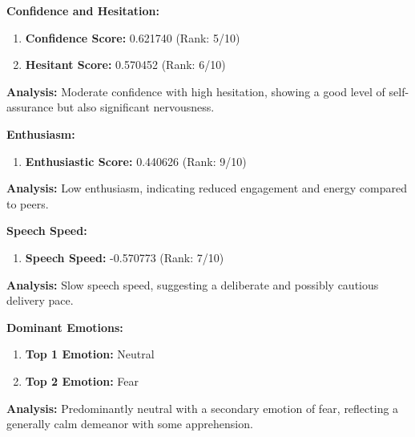 \documentclass{article}
\begin{document}
\large{\textbf{Confidence and Hesitation:}}
\begin{tcolorbox}[title=Confidence and Hesitant Scores]
    \begin{enumerate}
        \item \textbf{Confidence Score:} \textcolor{green!50!black}{0.621740} (Rank: 5/10)
        \item \textbf{Hesitant Score:} \textcolor{red!70!black}{0.570452} (Rank: 6/10)
    \end{enumerate}
\end{tcolorbox}
    \textbf{Analysis:} Moderate confidence with high hesitation, showing a good level of self-assurance but also significant nervousness.

\large{\textbf{Enthusiasm:}}
\begin{tcolorbox}[colback=cyan!5!white,colframe=cyan!75!black,title=Enthusiastic Score]
    \begin{enumerate}
        \item \textbf{Enthusiastic Score:} \textcolor{orange!70!black}{0.440626} (Rank: 9/10)
    \end{enumerate}
\end{tcolorbox}
    \textbf{Analysis:} Low enthusiasm, indicating reduced engagement and energy compared to peers.

\large{\textbf{Speech Speed:}}
\begin{tcolorbox}[title=Speech Speed]
    \begin{enumerate}
        \item \textbf{Speech Speed:} \textcolor{purple!70!black}{-0.570773} (Rank: 7/10)
    \end{enumerate}
\end{tcolorbox}
    \textbf{Analysis:} Slow speech speed, suggesting a deliberate and possibly cautious delivery pace.

\large{\textbf{Dominant Emotions:}}
\begin{tcolorbox}[colback=red!5!white,colframe=red!75!black,title=Emotional State]
    \begin{enumerate}
        \item \textbf{Top 1 Emotion:} \textcolor{blue!80!black}{Neutral}
        \item \textbf{Top 2 Emotion:} \textcolor{red!80!black}{Fear}
    \end{enumerate}
\end{tcolorbox}
    \textbf{Analysis:} Predominantly neutral with a secondary emotion of fear, reflecting a generally calm demeanor with some apprehension.
\end{document}
